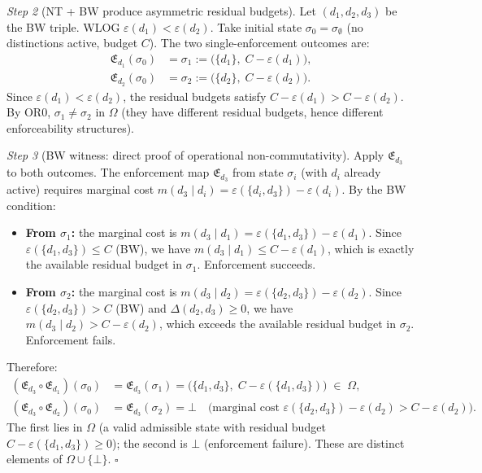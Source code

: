\documentclass[11pt]{article}
\theoremstyle{remark}
\begin{document}
\begin{tcolorbox}[apfbox, title={Theorem T1 --- The Bridge Theorem (Order-Dependence)}]
\textit{Step 2} (NT + BW produce asymmetric residual budgets).  Let $(d_1, d_2, d_3)$ be the BW triple.  WLOG $\varepsilon(d_1) < \varepsilon(d_2)$.  Take initial state $\sigma_0 = \sigma_\emptyset$ (no distinctions active, budget $C$).  The two single-enforcement outcomes are:
\begin{align*}
\mathfrak{E}_{d_1}(\sigma_0) &= \sigma_1 := \bigl(\{d_1\},\; C - \varepsilon(d_1)\bigr), \\
\mathfrak{E}_{d_2}(\sigma_0) &= \sigma_2 := \bigl(\{d_2\},\; C - \varepsilon(d_2)\bigr).
\end{align*}
Since $\varepsilon(d_1) < \varepsilon(d_2)$, the residual budgets satisfy $C - \varepsilon(d_1) > C - \varepsilon(d_2)$.  By OR0, $\sigma_1 \ne \sigma_2$ in $\Omega$ (they have different residual budgets, hence different enforceability structures).

\textit{Step 3} (BW witness: direct proof of operational non-commutativity).  Apply $\mathfrak{E}_{d_3}$ to both outcomes.  The enforcement map $\mathfrak{E}_{d_3}$ from state $\sigma_i$ (with $d_i$ already active) requires marginal cost $m(d_3 \mid d_i) = \varepsilon(\{d_i, d_3\}) - \varepsilon(d_i)$.  By the BW condition:
\begin{itemize}[nosep,leftmargin=2em,itemsep=2pt]
  \item \textbf{From $\sigma_1$:} the marginal cost is $m(d_3 \mid d_1) = \varepsilon(\{d_1,d_3\}) - \varepsilon(d_1)$.  Since $\varepsilon(\{d_1,d_3\}) \le C$ (BW), we have $m(d_3 \mid d_1) \le C - \varepsilon(d_1)$, which is exactly the available residual budget in $\sigma_1$.  Enforcement succeeds.
  \item \textbf{From $\sigma_2$:} the marginal cost is $m(d_3 \mid d_2) = \varepsilon(\{d_2,d_3\}) - \varepsilon(d_2)$.  Since $\varepsilon(\{d_2,d_3\}) > C$ (BW) and $\Delta(d_2,d_3) \ge 0$, we have $m(d_3 \mid d_2) > C - \varepsilon(d_2)$, which exceeds the available residual budget in $\sigma_2$.  Enforcement fails.
\end{itemize}
Therefore:
\begin{align}
(\mathfrak{E}_{d_3} \circ \mathfrak{E}_{d_1})(\sigma_0) &= \mathfrak{E}_{d_3}(\sigma_1) = \bigl(\{d_1, d_3\},\; C - \varepsilon(\{d_1,d_3\})\bigr) \;\in\; \Omega, \label{eq:T1_ord1}\\
(\mathfrak{E}_{d_3} \circ \mathfrak{E}_{d_2})(\sigma_0) &= \mathfrak{E}_{d_3}(\sigma_2) = \bot \quad \bigl(\text{marginal cost } \varepsilon(\{d_2,d_3\}) - \varepsilon(d_2) > C - \varepsilon(d_2)\bigr). \label{eq:T1_ord2}
\end{align}
The first lies in $\Omega$ (a valid admissible state with residual budget $C - \varepsilon(\{d_1,d_3\}) \ge 0$); the second is $\bot$ (enforcement failure).  These are distinct elements of $\Omega \cup \{\bot\}$.  \hfill$\square$


\end{tcolorbox}
\end{document}
